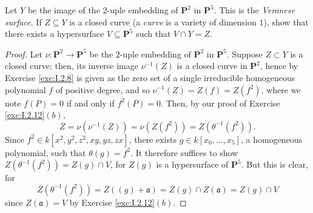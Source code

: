 \documentclass[10pt]{article}
\theoremstyle{definition}
\theoremstyle{remark}
\numberwithin{equation}{section}
\numberwithin{figure}{subsubsection}
\newcommand{\PP}{\mathbf{P}}
\begin{document}
\begin{problem}
  Let $Y$ be the image of the $2$-uple embedding of $\PP^2$ in $\PP^5$. This is the
  \emph{Veronese surface}. If $Z \subseteq Y$ is a closed curve (a \emph{curve} is 
  a variety of dimension $1$), show that there exists a hypersurface $V \subseteq
  \PP^5$ such that $V \cap Y = Z$. 
\end{problem}
\begin{proof}
  Let $\nu\colon \PP^2 \to \PP^5$ be the $2$-uple embedding of $\PP^2$ in
  $\PP^5$. Suppose $Z \subset Y$ is a closed curve; then, its inverse image
  $\nu^{-1}(Z)$ is a closed curve in $\PP^2$, hence by Exercise \ref{exc:I.2.8} is
  given as the zero set of a single irreducible homogeneous polynomial $f$ of
  positive degree, and so $\nu^{-1}(Z) = Z(f) = Z(f^2)$, where we note $f(P) =
  0$ if and only if $f^2(P) = 0$. Then, by our proof of Exercise
  \ref{exc:I.2.12}$(b)$,
  \begin{equation*}
    Z = \nu(\nu^{-1}(Z)) = \nu(Z(f^2)) = Z(\theta^{-1}(f^2)).
  \end{equation*}
  Since $f^2 \in k[x^2,y^2,z^2,xy,yz,zx]$, there exists $g \in
  k[x_0,\ldots,x_5]$,
  a homogeneous polynomial, such that $\theta(g) = f^2$.
  It therefore suffices to show $Z(\theta^{-1}(f^2)) = Z(g) \cap V$, for $Z(g)$
  is a hypersurface of $\PP^5$. But this is clear, for
  \begin{equation*}
    Z(\theta^{-1}(f^2)) = Z((g)+\mathfrak{a}) = Z(g) \cap Z(\mathfrak{a}) =
    Z(g) \cap V
  \end{equation*}
  since $Z(\mathfrak{a}) = V$ by Exercise \ref{exc:I.2.12}$(b)$.
\end{proof}
\end{document}
